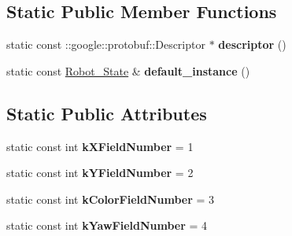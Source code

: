 \subsection*{Static Public Member Functions}
\begin{DoxyCompactItemize}
\item 
static const \+::google\+::protobuf\+::\+Descriptor $\ast$ {\bfseries descriptor} ()\hypertarget{classvss__state_1_1Robot__State_af15c0b33b2edbd683bfb87c76e9b94b7}{}\label{classvss__state_1_1Robot__State_af15c0b33b2edbd683bfb87c76e9b94b7}

\item 
static const \hyperlink{classvss__state_1_1Robot__State}{Robot\+\_\+\+State} \& {\bfseries default\+\_\+instance} ()\hypertarget{classvss__state_1_1Robot__State_aa14ffa0e9a4e47e1c824b2c82039b02c}{}\label{classvss__state_1_1Robot__State_aa14ffa0e9a4e47e1c824b2c82039b02c}

\end{DoxyCompactItemize}
\subsection*{Static Public Attributes}
\begin{DoxyCompactItemize}
\item 
static const int {\bfseries k\+X\+Field\+Number} = 1\hypertarget{classvss__state_1_1Robot__State_a928f084cd2d0fc573071b7193e0c7c0a}{}\label{classvss__state_1_1Robot__State_a928f084cd2d0fc573071b7193e0c7c0a}

\item 
static const int {\bfseries k\+Y\+Field\+Number} = 2\hypertarget{classvss__state_1_1Robot__State_a17b26fab9fee8484866c751fb2f36325}{}\label{classvss__state_1_1Robot__State_a17b26fab9fee8484866c751fb2f36325}

\item 
static const int {\bfseries k\+Color\+Field\+Number} = 3\hypertarget{classvss__state_1_1Robot__State_a941074e9004ce28bc7cddfd36aeacb43}{}\label{classvss__state_1_1Robot__State_a941074e9004ce28bc7cddfd36aeacb43}

\item 
static const int {\bfseries k\+Yaw\+Field\+Number} = 4\hypertarget{classvss__state_1_1Robot__State_a1a2ca06cd76b5f7343198d45237a9727}{}\label{classvss__state_1_1Robot__State_a1a2ca06cd76b5f7343198d45237a9727}

\end{DoxyCompactItemize}
